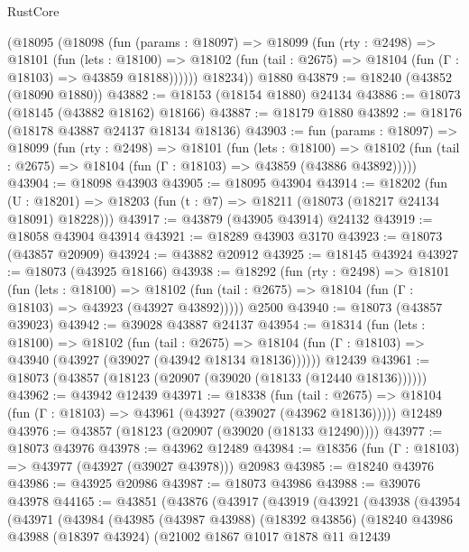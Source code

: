 \begin{lexlean}{RustCore}
\begin{coremodule}
      (@18095
        (@18098
          (fun (params : @18097) =>
          @18099
            (fun (rty : @2498) =>
            @18101
              (fun (lets : @18100) =>
              @18102 (fun (tail : @2675) => @18104 (fun (Γ : @18103) => @43859 @18188))))))
        @18234))
    @1880
@43879 := @18240 (@43852 (@18090 @1880))
@43882 := @18153 (@18154 @1880) @24134
@43886 := @18073 (@18145 (@43882 @18162) @18166)
@43887 := @18179 @1880
@43892 := @18176 (@18178 @43887 @24137 @18134 @18136)
@43903 := fun (params : @18097) =>
  @18099
    (fun (rty : @2498) =>
    @18101
      (fun (lets : @18100) =>
      @18102 (fun (tail : @2675) => @18104 (fun (Γ : @18103) => @43859 (@43886 @43892)))))
@43904 := @18098 @43903
@43905 := @18095 @43904
@43914 := @18202
    (fun (U : @18201) => @18203 (fun (t : @7) => @18211 (@18073 (@18217 @24134 @18091) @18228)))
@43917 := @43879 (@43905 @43914) @24132
@43919 := @18058 @43904 @43914
@43921 := @18289 @43903 @3170
@43923 := @18073 (@43857 @20909)
@43924 := @43882 @20912
@43925 := @18145 @43924
@43927 := @18073 (@43925 @18166)
@43938 := @18292
    (fun (rty : @2498) =>
    @18101
      (fun (lets : @18100) =>
      @18102 (fun (tail : @2675) => @18104 (fun (Γ : @18103) => @43923 (@43927 @43892)))))
    @2500
@43940 := @18073 (@43857 @39023)
@43942 := @39028 @43887 @24137
@43954 := @18314
    (fun (lets : @18100) =>
    @18102
      (fun (tail : @2675) =>
      @18104 (fun (Γ : @18103) => @43940 (@43927 (@39027 (@43942 @18134 @18136))))))
    @12439
@43961 := @18073 (@43857 (@18123 (@20907 (@39020 (@18133 (@12440 @18136))))))
@43962 := @43942 @12439
@43971 := @18338
    (fun (tail : @2675) => @18104 (fun (Γ : @18103) => @43961 (@43927 (@39027 (@43962 @18136)))))
    @12489
@43976 := @43857 (@18123 (@20907 (@39020 (@18133 @12490))))
@43977 := @18073 @43976
@43978 := @43962 @12489
@43984 := @18356 (fun (Γ : @18103) => @43977 (@43927 (@39027 @43978))) @20983
@43985 := @18240 @43976
@43986 := @43925 @20986
@43987 := @18073 @43986
@43988 := @39076 @43978
@44165 := @43851
    (@43876
      (@43917
        (@43919
          (@43921
            (@43938
              (@43954
                (@43971
                  (@43984
                    (@43985
                      (@43987 @43988)
                      (@18392 @43856)
                      (@18240
                        @43986
                        @43988
                        (@18397 @43924)
                        (@21002
                          @1867
                          @1017
                          @1878
                          @11
                          @12439

\end{coremodule}
\end{lexlean}
